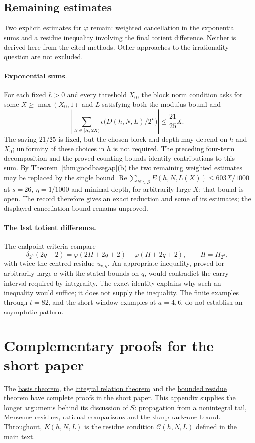 \documentclass[11pt]{article}
\theoremstyle{plain}
\theoremstyle{definition}
\theoremstyle{remark}
\newcommand{\shortpaper}[2]{\href{erdos-249-binary-totient-series.pdf\##1}{#2}}
\begin{document}
\subsection{Remaining estimates}

Two explicit estimates for $\varphi$ remain: weighted cancellation
in the exponential sums and a residue inequality involving the final
totient difference. Neither is derived here from the cited methods.
Other approaches to the irrationality question are not excluded.



\paragraph{Exponential sums.} For each fixed $h>0$ and every
threshold $X_0$, the block norm condition asks for some $X\ge\max(X_0,1)$
and $L$ satisfying both the modulus bound and
\[
 \left|\sum_{N\in[X,2X)}e\bigl(D(h,N,L)/2^L\bigr)\right|
       \le\frac{21}{25}X.
\]
The saving $21/25$ is fixed, but the chosen block and depth may depend
on $h$ and $X_0$; uniformity of these choices in $h$ is not required.
The preceding four-term decomposition and the proved counting bounds
identify contributions to this sum. By
Theorem~\ref{thm:goodbasegap}(b) the two remaining weighted estimates may
be replaced by the single bound
$\operatorname{Re}\sum_{N\in\mathcal G}E(h,N,L(X))\le603X/1000$ at
$s=26$, $\eta=1/1000$ and minimal depth, for arbitrarily large $X$; that
bound is open. The record therefore gives an exact reduction and some of
its estimates; the displayed cancellation bound remains unproved.

\paragraph{The last totient difference.} The endpoint criteria compare
\[
 \delta_{2^a}(2q+2)
   =\varphi(2H+2q+2)-\varphi(H+2q+2),\qquad H=H_{2^a},
\]
with twice the centred residue $u_{a,q}$. An appropriate inequality,
proved for arbitrarily large $a$ with the stated bounds on $q$, would
contradict the carry interval required by integrality. The exact identity
explains why such an inequality would suffice; it does not supply the
inequality. The finite examples through $t=82$, and the short-window
examples at $a=4,6$, do not establish an asymptotic pattern.


\clearpage
\appendix
\section{Complementary proofs for the short paper}\label{app:r3-complements}
The \shortpaper{short249-proof}{basis theorem}, the
\shortpaper{short249-base-six}{integral relation theorem} and the
\shortpaper{short249-residues}{bounded residue theorem} have complete
proofs in the short paper. This appendix supplies the longer arguments
behind its discussion of $S$: propagation from a nonintegral tail,
Mersenne residues, rational comparisons and the sharp rank-one bound.
Throughout, $K(h,N,L)$ is the residue condition
$\mathcal C(h,N,L)$ defined in the main text.
\end{document}
